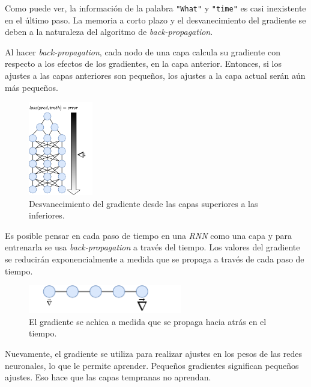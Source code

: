 \documentclass[a4paper,12pt]{article}
\begin{document}
Como puede ver, la información de la palabra \texttt{"What"} y \texttt{"time"} es casi inexistente en el último paso. La memoria a corto plazo y el desvanecimiento del gradiente se deben a la naturaleza del algoritmo de \textit{back-propagation}.

Al hacer \textit{back-propagation}, cada nodo de una capa calcula su gradiente con respecto a los efectos de los gradientes, en la capa anterior. Entonces, si los ajustes a las capas anteriores son pequeños, los ajustes a la capa actual serán aún más pequeños. 

\begin{figure}[H]
	\begin{center}				
		\includegraphics[width=0.25\textwidth]{vanishing4.png}
		\caption{Desvanecimiento del gradiente desde las capas superiores a las inferiores.}
		\label{fig:rnnvanishing4}
	\end{center}
\end{figure}

Es posible pensar en cada paso de tiempo en una \textit{RNN} como una capa y para entrenarla se usa \textit{back-propagation} a través del tiempo. Los valores del gradiente se reducirán exponencialmente a medida que se propaga a través de cada paso de tiempo.

\begin{figure}[H]
	\begin{center}				
		\includegraphics[width=0.6\textwidth]{vanishing5.png}
		\caption{El gradiente se achica a medida que se propaga hacia atrás en el tiempo.}
		\label{fig:rnnvanishing5}
	\end{center}
\end{figure}

Nuevamente, el gradiente se utiliza para realizar ajustes en los pesos de las redes neuronales, lo que le permite aprender. Pequeños gradientes significan pequeños ajustes. Eso hace que las capas tempranas no aprendan.
\end{document}
